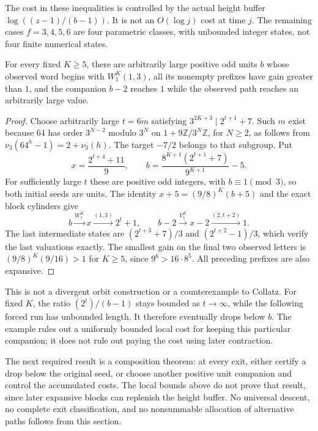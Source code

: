 The cost in these inequalities is controlled by the actual height
buffer $\log((z-1)/(b-1))$. It is not an $O(\log j)$ cost at time $j$.
The remaining cases $f=3,4,5,6$ are four parametric classes, with
unbounded integer states, not four finite numerical states.

\begin{proposition}
\label{pp:collapse-family}
For every fixed $K\ge5$, there are arbitrarily large positive odd
units $b$ whose observed word begins with $W_1^K(1,3)$, all its
nonempty prefixes have gain greater than $1$, and the companion
$b-2$ reaches $1$ while the observed path reaches an arbitrarily
large value.
\end{proposition}
\begin{proof}
Choose arbitrarily large $t=6m$ satisfying
$3^{2K+3}\mid 2^{t+1}+7$. Such $m$ exist because $64$ has order
$3^{N-2}$ modulo $3^N$ on $1+9\mathbb Z/3^N\mathbb Z$, for $N\ge2$,
as follows from $\nu_3(64^h-1)=2+\nu_3(h)$. The target $-7/2$
belongs to that subgroup. Put
\[
 x=\frac{2^{t+4}+11}{9},\qquad
 b=\frac{8^{K+1}(2^{t+1}+7)}{9^{K+1}}-5.
\]
For sufficiently large $t$ these are positive odd integers, with
$b\equiv1\pmod3$, so both initial seeds are units. The identity
$x+5=(9/8)^K(b+5)$ and the exact block cylinders give
\[
 b\xrightarrow{W_1^K}x\xrightarrow{(1,3)}2^t+1,
 \qquad
 b-2\xrightarrow{V_1^K}x-2\xrightarrow{(2,t+2)}1.
\]
The last intermediate states are $(2^{t+3}+7)/3$ and
$(2^{t+2}-1)/3$, which verify the last valuations exactly.
The smallest gain on the final two observed letters is
$(9/8)^K(9/16)>1$ for $K\ge5$, since $9^6>16\cdot8^5$.
All preceding prefixes are also expansive.
\end{proof}

This is not a divergent orbit construction or a counterexample to
Collatz. For fixed $K$, the ratio $(2^t)/(b-1)$ stays bounded as
$t\to\infty$, while the following forced run has unbounded length.
It therefore eventually drops below $b$. The example rules out a
uniformly bounded local cost for keeping this particular companion;
it does not rule out paying the cost using later contraction.

The next required result is a composition theorem: at every exit,
either certify a drop below the original seed, or choose another
positive unit companion and control the accumulated costs. The local
bounds above do not prove that result, since later expansive blocks
can replenish the height buffer. No universal descent, no complete
exit classification, and no nonsummable allocation of alternative
paths follows from this section.
